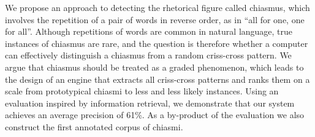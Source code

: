 We propose an approach to detecting the rhetorical figure called chiasmus, which involves the repetition of a pair of words in reverse order, as in ``all for one, one for all''. Although repetitions of words are common in natural language, true instances of chiasmus are rare, and the question is therefore whether a computer can effectively distinguish a chiasmus from a random criss-cross pattern. We argue that chiasmus should be treated as a graded phenomenon, which leads to the design of an engine that extracts all criss-cross patterns and ranks them on a scale from prototypical chiasmi to less and less likely instances. Using an evaluation inspired by information retrieval, we demonstrate that our system achieves an average precision of 61\%. As a by-product of the evaluation we also construct the first annotated corpus of chiasmi.
